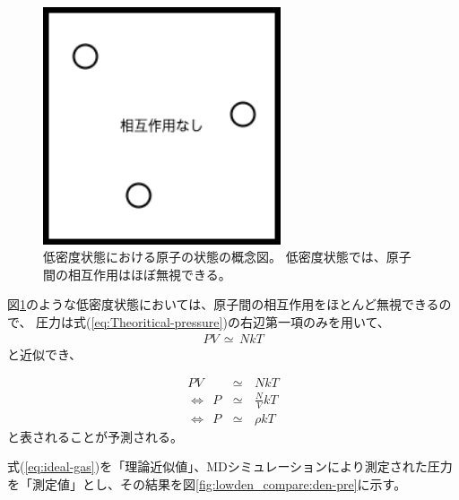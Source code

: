 \documentclass[titlepage]{jsreport}
\begin{document}
{{{\begin{figure}[htbp]
    \begin{center}
        \includegraphics[width=7cm]{fig/lowdensity.png}
    \end{center}
    \caption{低密度状態における原子の状態の概念図。
    低密度状態では、原子間の相互作用はほぼ無視できる。}
    \label{fig:lowdensity.png}
\end{figure}

図\ref{fig:lowdensity.png}のような低密度状態においては、原子間の相互作用をほとんど無視できるので、
圧力は式(\ref{eq:Theoritical-pressure})の右辺第一項のみを用いて、
\large
\begin{eqnarray}
PV\,{\simeq}\,NkT　\nonumber
\end{eqnarray}
\normalsize
と近似でき、

\newpage
\large
\begin{eqnarray}
PV\,&{\simeq}&\,NkT\nonumber\\
{\Leftrightarrow}{\ }{\ }P\,&{\simeq}&\,{\frac{N}{V}}kT\nonumber\\
{\Leftrightarrow}{\ }{\ }P\,&{\simeq}&\,{\rho}kT \label{eq:ideal-gas}
\end{eqnarray}
\normalsize
と表されることが予測される。

式(\ref{eq:ideal-gas})を「理論近似値」、MDシミュレーションにより測定された圧力を「測定値」とし、その結果を図\ref{fig:lowden_compare:den-pre}に示す。

}}}
\end{document}
